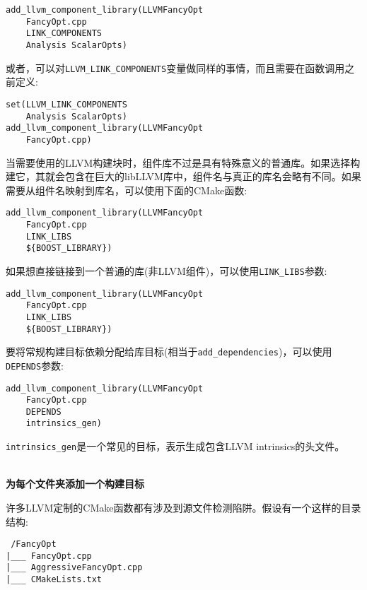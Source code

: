 \begin{lstlisting}[style=styleCMake]
add_llvm_component_library(LLVMFancyOpt
	FancyOpt.cpp
	LINK_COMPONENTS
	Analysis ScalarOpts)
\end{lstlisting}

或者，可以对\texttt{LLVM\_LINK\_COMPONENTS}变量做同样的事情，而且需要在函数调用之前定义:

\begin{lstlisting}[style=styleCMake]
set(LLVM_LINK_COMPONENTS
	Analysis ScalarOpts)
add_llvm_component_library(LLVMFancyOpt
	FancyOpt.cpp)
\end{lstlisting}

当需要使用的LLVM构建块时，组件库不过是具有特殊意义的普通库。如果选择构建它，其就会包含在巨大的libLLVM库中，组件名与真正的库名会略有不同。如果需要从组件名映射到库名，可以使用下面的CMake函数:

\begin{lstlisting}[style=styleCMake]
add_llvm_component_library(LLVMFancyOpt
	FancyOpt.cpp
	LINK_LIBS
	${BOOST_LIBRARY})
\end{lstlisting}

如果想直接链接到一个普通的库(非LLVM组件)，可以使用\texttt{LINK\_LIBS}参数:

\begin{lstlisting}[style=styleCMake]
add_llvm_component_library(LLVMFancyOpt
	FancyOpt.cpp
	LINK_LIBS
	${BOOST_LIBRARY})
\end{lstlisting}

要将常规构建目标依赖分配给库目标(相当于\texttt{add\_dependencies})，可以使用\texttt{DEPENDS}参数:

\begin{lstlisting}[style=styleCMake]
add_llvm_component_library(LLVMFancyOpt
	FancyOpt.cpp
	DEPENDS
	intrinsics_gen)
\end{lstlisting}

\texttt{intrinsics\_gen}是一个常见的目标，表示生成包含LLVM intrinsics的头文件。

\hspace*{\fill} \\
\noindent
\textbf{为每个文件夹添加一个构建目标}

许多LLVM定制的CMake函数都有涉及到源文件检测陷阱。假设有一个这样的目录结构:

\begin{tcolorbox}[colback=white,colframe=black]
\tt
{}
/FancyOpt \\
\hspace*{0.5cm}|\_\_\_ FancyOpt.cpp \\
\hspace*{0.5cm}|\_\_\_ AggressiveFancyOpt.cpp \\
\hspace*{0.5cm}|\_\_\_ CMakeLists.txt
\end{tcolorbox}

